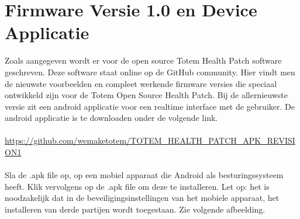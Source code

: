 \documentclass[conference]{IEEEtran}
\begin{document}
\section{Firmware Versie 1.0 en Device Applicatie}
Zoals aangegeven wordt er voor de open source Totem Health Patch software geschreven. Deze software staat online op de GitHub community. Hier vindt men de nieuwste voorbeelden en compleet werkende firmware versies die speciaal ontwikkeld zijn voor de Totem Open Source Health Patch. Bij de allernieuwste versie zit een android applicatie voor een realtime interface met de gebruiker. De android applicatie is te downloaden onder de volgende link.\\\\ \url{https://github.com/wemaketotem/TOTEM_HEALTH_PATCH_APK_REVISION1}\\\\ Sla de .apk file op, op een mobiel apparaat die Android als besturingssysteem heeft. Klik vervolgens op de .apk file om deze te installeren. Let op: het is noodzakelijk dat in de beveiligingsinstellingen van het mobiele apparaat, het installeren van derde partijen wordt toegestaan. Zie volgende afbeelding.
\end{document}
